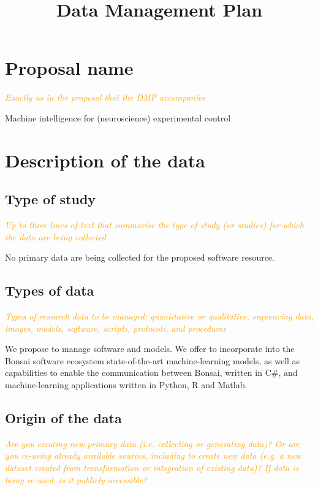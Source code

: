 \documentclass[a4paper,11pt]{article}
\title{Data Management Plan}
\author{}
\date{}
\begin{document}
\maketitle

\setcounter{section}{-1}

\section{Proposal name}

\textcolor{orange}{\textit{Exactly as in the proposal that the DMP accompanies}}

Machine intelligence for (neuroscience) experimental control

\section{Description of the data}
\subsection{Type of study}

\textcolor{orange}{\textit{Up to three lines of text that summarise the type of study (or studies) for which the data are being collected}}

No primary data are being collected for the proposed software resource.

\subsection{Types of data}

\textcolor{orange}{\textit{Types of research data to be managed: quantitative or
qualitative, sequencing data, images, models, software, scripts, protocols, and
procedures}}

We propose to manage software and models. We offer to incorporate into the
Bonsai software ecosystem state-of-the-art machine-learning models, as well as
capabilities to enable the communication between Bonsai, written in C\#, and
machine-learning applications written in Python, R and Matlab.

\subsection{Origin of the data}

\textcolor{orange}{\textit{Are you creating new primary data (i.e. collecting or
generating data)? Or are you re-using already available sources, including to
create new data (e.g. a new dataset created from transformation or integration
of existing data)? If data is being re-used, is it publicly accessible?}}
\end{document}
